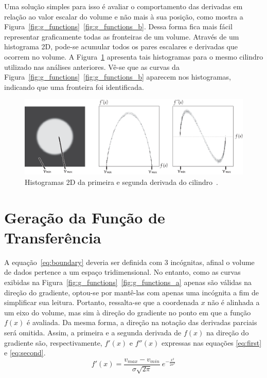 	Uma solução simples para isso é avaliar o comportamento das derivadas em relação ao valor escalar do volume e não mais à sua posição, como mostra a Figura~\ref{fig:g_functions}~\ref{fig:g_functions_b}. Dessa forma fica mais fácil representar graficamente todas as fronteiras de um volume. Através de um histograma 2D, pode-se acumular todos os pares escalares e derivadas que ocorrem no volume. A Figura~\ref{fig:g_histo_cil} apresenta tais histogramas para o mesmo cilindro utilizado nas análises anteriores. Vê-se que as curvas da Figura~\ref{fig:g_functions}~\ref{fig:g_functions_b} aparecem nos histogramas, indicando que uma fronteira foi identificada.
	
\begin{figure}[h]
	\centering
	\includegraphics[width=1\textwidth]{images/g_histo_cil}
	\caption{Histogramas 2D da primeira e segunda derivada do cilindro~\cite{gordonms}.}
	\label{fig:g_histo_cil}
\end{figure}
    
\section{Geração da Função de Transferência}
\label{gordon.ft}
	A equação~\eqref{eq:boundary} deveria ser definida com 3 incógnitas, afinal o volume de dados pertence a um espaço tridimensional. No entanto, como as curvas exibidas na Figura~\ref{fig:g_functions}~\ref{fig:g_functions_a} apenas são válidas na direção do gradiente, optou-se por mantê-las com apenas uma incógnita a fim de simplificar sua leitura. Portanto, ressalta-se que a coordenada $x$ não é alinhada a um eixo do volume, mas sim à direção do gradiente no ponto em que a função $f(x)$ é avaliada. Da mesma forma, a direção na notação das derivadas parciais será omitida. Assim, a primeira e a segunda derivada de $f(x)$ na direção do gradiente são, respectivamente, $f'(x)$ e $f''(x)$ expressas nas equações \eqref{eq:first} e \eqref{eq:second}. \\
	
\begin{equation} \label{eq:first}
	f'(x) = \frac{v_{max} - v_{min}}{\sigma\sqrt{2\pi}}\ e^{-\frac{x^{2}}{2\sigma^{2}}}
\end{equation} \\

